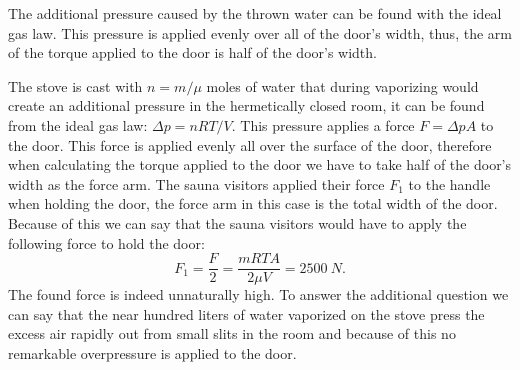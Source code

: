 \hinteng
The additional pressure caused by the thrown water can be found with the ideal gas law. This pressure is applied evenly over all of the door's width, thus, the arm of the torque applied to the door is half of the door's width.

\solueng
The stove is cast with $n=m/\mu$ moles of water that during vaporizing would create an additional pressure in the hermetically closed room, it can be found from the ideal gas law: $\Delta p = nRT/V$. This pressure applies a force $F=\Delta p A$ to the door. This force is applied evenly all over the surface of the door, therefore when calculating the torque applied to the door we have to take half of the door’s width as the force arm. The sauna visitors applied their force $F_1$ to the handle when holding the door, the force arm in this case is the total width of the door. Because of this we can say that the sauna visitors would have to apply the following force to hold the door:
\[F_1 = \frac{F}{2} = \frac{mRTA}{2 \mu V} = \SI{2500}{N}.\] 
The found force is indeed unnaturally high. To answer the additional question we can say that the near hundred liters of water vaporized on the stove press the excess air rapidly out from small slits in the room and because of this no remarkable overpressure is applied to the door.
\probend